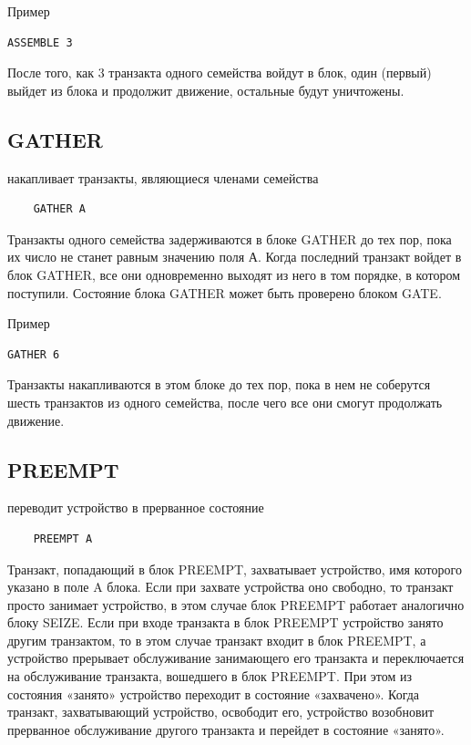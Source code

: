 \documentclass[14pt]{extarticle}
\begin{document}
Пример

\begin{lstlisting}
ASSEMBLE 3
\end{lstlisting}

После того, как 3 транзакта одного семейства войдут в блок, один (первый) выйдет из блока и продолжит движение, остальные будут уничтожены.

\subsection*{GATHER}

накапливает транзакты, являющиеся членами семейства

\begin{lstlisting}
	GATHER A
\end{lstlisting}

Транзакты одного семейства задерживаются в блоке GATHER до тех пор, пока их число не станет равным значению поля А. Когда последний транзакт войдет в блок GATHER, все они одновременно выходят из него в том порядке, в котором поступили. Состояние блока GATHER может быть проверено блоком GATE.

Пример

\begin{lstlisting}
GATHER 6
\end{lstlisting}

Транзакты накапливаются в этом блоке до тех пор, пока в нем не соберутся шесть транзактов из одного семейства, после чего все они смогут продолжать движение.

\subsection*{PREEMPT}

переводит устройство в прерванное состояние

\begin{lstlisting}
	PREEMPT A
\end{lstlisting}

Транзакт, попадающий в блок PREEMPT, захватывает устройство, имя которого указано в поле A блока. Если при захвате устройства оно свободно, то транзакт просто занимает устройство, в этом случае блок PREEMPT работает аналогично блоку SEIZE. Если при входе транзакта в блок PREEMPT устройство занято другим транзактом, то в этом случае транзакт входит в блок PREEMPT, а устройство прерывает обслуживание занимающего его транзакта и переключается на обслуживание транзакта, вошедшего в блок PREEMPT. При этом из состояния «занято» устройство переходит в состояние «захвачено». Когда транзакт, захватывающий устройство, освободит его, устройство возобновит прерванное обслуживание другого транзакта и перейдет в состояние «занято».
\end{document}
